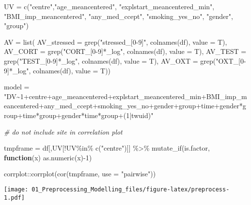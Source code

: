 \documentclass[
]{article}
\newenvironment{Shaded}{\begin{snugshade}}{\end{snugshade}}
\newcommand{\AttributeTok}[1]{\textcolor[rgb]{0.77,0.63,0.00}{#1}}
\newcommand{\CommentTok}[1]{\textcolor[rgb]{0.56,0.35,0.01}{\textit{#1}}}
\newcommand{\ControlFlowTok}[1]{\textcolor[rgb]{0.13,0.29,0.53}{\textbf{#1}}}
\newcommand{\DecValTok}[1]{\textcolor[rgb]{0.00,0.00,0.81}{#1}}
\newcommand{\FunctionTok}[1]{\textcolor[rgb]{0.00,0.00,0.00}{#1}}
\newcommand{\NormalTok}[1]{#1}
\newcommand{\OtherTok}[1]{\textcolor[rgb]{0.56,0.35,0.01}{#1}}
\newcommand{\SpecialCharTok}[1]{\textcolor[rgb]{0.00,0.00,0.00}{#1}}
\newcommand{\StringTok}[1]{\textcolor[rgb]{0.31,0.60,0.02}{#1}}
\begin{document}
\begin{Shaded}
\begin{Highlighting}[]
\NormalTok{UV }\OtherTok{=} \FunctionTok{c}\NormalTok{(}\StringTok{"centre"}\NormalTok{,}\StringTok{"age\_meancentered"}\NormalTok{, }\StringTok{"explstart\_meancentered\_min"}\NormalTok{, }
  \StringTok{"BMI\_imp\_meancentered"}\NormalTok{, }\StringTok{"any\_med\_ccept"}\NormalTok{, }\StringTok{"smoking\_yes\_no"}\NormalTok{, }\StringTok{"gender"}\NormalTok{, }\StringTok{"group"}\NormalTok{)}


\NormalTok{AV }\OtherTok{=} \FunctionTok{list}\NormalTok{(}
\AttributeTok{AV\_stressed =} \FunctionTok{grep}\NormalTok{(}\StringTok{"stressed\_[0{-}9]"}\NormalTok{, }\FunctionTok{colnames}\NormalTok{(df), }\AttributeTok{value =}\NormalTok{ T),}
\AttributeTok{AV\_CORT =} \FunctionTok{grep}\NormalTok{(}\StringTok{"CORT\_[0{-}9]*\_log"}\NormalTok{, }\FunctionTok{colnames}\NormalTok{(df), }\AttributeTok{value =}\NormalTok{ T),}
\AttributeTok{AV\_TEST =} \FunctionTok{grep}\NormalTok{(}\StringTok{"TEST\_[0{-}9]*\_log"}\NormalTok{, }\FunctionTok{colnames}\NormalTok{(df), }\AttributeTok{value =}\NormalTok{ T),}
\AttributeTok{AV\_OXT =} \FunctionTok{grep}\NormalTok{(}\StringTok{"OXT\_[0{-}9]*\_log"}\NormalTok{, }\FunctionTok{colnames}\NormalTok{(df), }\AttributeTok{value =}\NormalTok{ T))}


\NormalTok{model }\OtherTok{=} \StringTok{"DV\textasciitilde{}1+centre+age\_meancentered+explstart\_meancentered\_min+BMI\_imp\_meancentered+any\_med\_ccept+smoking\_yes\_no+gender+group+time+gender*group+time*group+gender*time*group+(1|twuid)"}

\CommentTok{\# do not include site in correlation plot }

\NormalTok{tmpframe }\OtherTok{=}\NormalTok{ df[,UV[}\SpecialCharTok{!}\NormalTok{UV}\SpecialCharTok{\%in\%} \FunctionTok{c}\NormalTok{(}\StringTok{"centre"}\NormalTok{)]] }\SpecialCharTok{\%\textgreater{}\%} \FunctionTok{mutate\_if}\NormalTok{(is.factor, }\ControlFlowTok{function}\NormalTok{(x) }\FunctionTok{as.numeric}\NormalTok{(x)}\SpecialCharTok{{-}}\DecValTok{1}\NormalTok{)}

\NormalTok{corrplot}\SpecialCharTok{::}\FunctionTok{corrplot}\NormalTok{(}\FunctionTok{cor}\NormalTok{(tmpframe, }\AttributeTok{use =} \StringTok{"pairwise"}\NormalTok{))}
\end{Highlighting}
\end{Shaded}

\texttt{[image: 01\_Preprocessing\_Modelling\_files/figure-latex/preprocess-1.pdf]}
\end{document}
